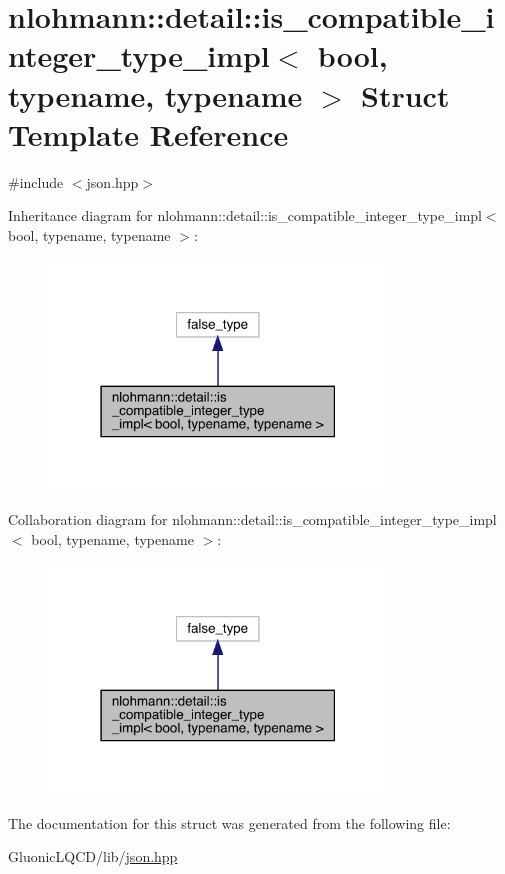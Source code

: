 \hypertarget{structnlohmann_1_1detail_1_1is__compatible__integer__type__impl}{}\section{nlohmann\+::detail\+::is\+\_\+compatible\+\_\+integer\+\_\+type\+\_\+impl$<$ bool, typename, typename $>$ Struct Template Reference}
\label{structnlohmann_1_1detail_1_1is__compatible__integer__type__impl}


{\ttfamily \#include $<$json.\+hpp$>$}



Inheritance diagram for nlohmann\+::detail\+::is\+\_\+compatible\+\_\+integer\+\_\+type\+\_\+impl$<$ bool, typename, typename $>$\+:
\nopagebreak
\begin{figure}[H]
\begin{center}
\leavevmode
\includegraphics[width=255pt]{structnlohmann_1_1detail_1_1is__compatible__integer__type__impl__inherit__graph}
\end{center}
\end{figure}


Collaboration diagram for nlohmann\+::detail\+::is\+\_\+compatible\+\_\+integer\+\_\+type\+\_\+impl$<$ bool, typename, typename $>$\+:
\nopagebreak
\begin{figure}[H]
\begin{center}
\leavevmode
\includegraphics[width=255pt]{structnlohmann_1_1detail_1_1is__compatible__integer__type__impl__coll__graph}
\end{center}
\end{figure}


The documentation for this struct was generated from the following file\+:\begin{DoxyCompactItemize}
\item 
Gluonic\+L\+Q\+C\+D/lib/\mbox{\hyperlink{json_8hpp}{json.\+hpp}}\end{DoxyCompactItemize}
